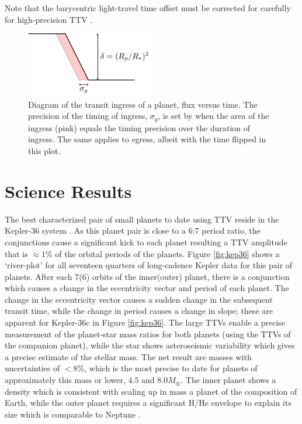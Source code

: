 \documentclass[graybox,natbib,nosecnum]{svmult}
\begin{document}
Note that the barycentric light-travel time offset must be corrected for carefully for high-precision
TTV \citep{2010PASP..122..935E}.

\begin{figure}
\centerline{
\includegraphics[width=0.5\textwidth]{ingress.pdf}}
%
\caption{Diagram of the transit ingress of a planet, flux versus time.  The precision of the timing of ingress, $\sigma_g$, is set by
when the area of the ingress (pink) equals the timing precision over the duration of ingress. The same applies to egress, albeit
with the time flipped in this plot.}
\label{fig:ingress}       %
\end{figure}


\section{Science Results}

The best characterized pair of small planets to date using TTV reside in the Kepler-36 system \citep{2012Sci...337..556C}.  As this planet pair is close to a 6:7 period ratio, the conjunctions cause a significant kick to each planet resulting a TTV amplitude that is $\approx 1$\% of the orbital periods of the planets.  Figure \ref{fig:kep36} shows a `river-plot' for all seventeen quarters of long-cadence Kepler data for this pair of planets.  After each 7(6) orbits of the inner(outer) planet, there is a conjunction which causes a change in the eccentricity vector and period of each planet.  The change in the eccentricity vector causes a sudden change in the subsequent transit time, while the change in period causes a change in slope;  these are apparent for Kepler-36c in Figure \ref{fig:kep36}.  The large TTVs enable a precise measurement of the planet-star mass ratios for both planets (using the TTVs of the companion planet), while the star shows asteroseismic variability which gives a precise estimate of the stellar mass.   The net result are masses with uncertainties of $<8$\%, which is the most precise to date for planets of approximately this mass or lower, $4.5$ and $8.0 M_\oplus$.  The inner planet shows a density which is consistent with scaling up in mass a planet of the composition of Earth, while the outer planet requires a significant H/He envelope to explain its size which is comparable to Neptune \citep{2012Sci...337..556C}.
\end{document}
